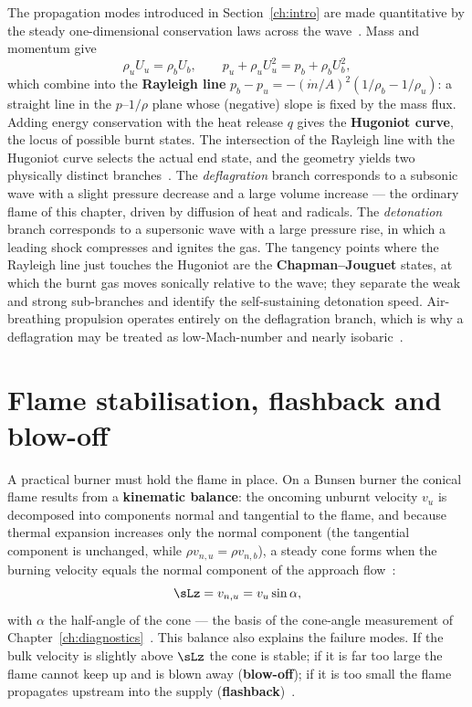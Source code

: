 The propagation modes introduced in Section~\ref{ch:intro} are made quantitative by the steady one-dimensional conservation laws across the wave~\cite{lecture4,glassman2014combustion}. Mass and momentum give
\begin{equation}
\rho_u U_u=\rho_b U_b,\qquad p_u+\rho_u U_u^2=p_b+\rho_b U_b^2,
\end{equation}
which combine into the \textbf{Rayleigh line} $p_b-p_u=-(\dot m/A)^2(1/\rho_b-1/\rho_u)$: a straight line in the $p$--$1/\rho$ plane whose (negative) slope is fixed by the mass flux. Adding energy conservation with the heat release $q$ gives the \textbf{Hugoniot curve}, the locus of possible burnt states. The intersection of the Rayleigh line with the Hugoniot curve selects the actual end state, and the geometry yields two physically distinct branches~\cite{lecture4,glassman2014combustion}. The \emph{deflagration} branch corresponds to a subsonic wave with a slight pressure decrease and a large volume increase --- the ordinary flame of this chapter, driven by diffusion of heat and radicals. The \emph{detonation} branch corresponds to a supersonic wave with a large pressure rise, in which a leading shock compresses and ignites the gas. The tangency points where the Rayleigh line just touches the Hugoniot are the \textbf{Chapman--Jouguet} states, at which the burnt gas moves sonically relative to the wave; they separate the weak and strong sub-branches and identify the self-sustaining detonation speed. Air-breathing propulsion operates entirely on the deflagration branch, which is why a deflagration may be treated as low-Mach-number and nearly isobaric~\cite{lecture4}.

\section{Flame stabilisation, flashback and blow-off}

A practical burner must hold the flame in place. On a Bunsen burner the conical flame results from a \textbf{kinematic balance}: the oncoming unburnt velocity $v_u$ is decomposed into components normal and tangential to the flame, and because thermal expansion increases only the normal component (the tangential component is unchanged, while $\rho v_{n,u}=\rho v_{n,b}$), a steady cone forms when the burning velocity equals the normal component of the approach flow~\cite{lecture5}:
\begin{equation}
\sLz=v_{n,u}=v_u\sin\alpha ,
\label{eq:bunsen}
\end{equation}
with $\alpha$ the half-angle of the cone --- the basis of the cone-angle measurement of Chapter~\ref{ch:diagnostics}~\cite{lecture5}. This balance also explains the failure modes. If the bulk velocity is slightly above $\sLz$ the cone is stable; if it is far too large the flame cannot keep up and is blown away (\textbf{blow-off}); if it is too small the flame propagates upstream into the supply (\textbf{flashback})~\cite{lecture5}.

